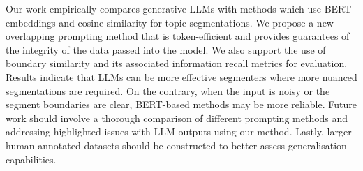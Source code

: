 
Our work empirically compares generative LLMs with methods which use BERT embeddings and cosine similarity for topic segmentations. We propose a new overlapping prompting method that is token-efficient and provides guarantees of the integrity of the data passed into the model. We also support the use of boundary similarity and its associated information recall metrics for evaluation. Results indicate that LLMs can be more effective segmenters where more nuanced segmentations are required. On the contrary, when the input is noisy or the segment boundaries are clear, BERT-based methods may be more reliable. Future work should involve a thorough comparison of different prompting methods and addressing highlighted issues with LLM outputs using our method. Lastly, larger human-annotated datasets should be constructed to better assess generalisation capabilities.